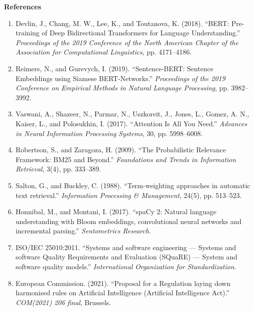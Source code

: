 \documentclass[12pt,a4paper]{report}
\begin{document}
\newpage
{}
\begin{center}
    {\Large \textbf{References}}
\end{center}
\vspace{0.8cm}

\begin{enumerate}
    \item Devlin, J., Chang, M. W., Lee, K., and Toutanova, K. (2018). ``BERT: Pre-training of Deep Bidirectional Transformers for Language Understanding.'' \textit{Proceedings of the 2019 Conference of the North American Chapter of the Association for Computational Linguistics}, pp. 4171--4186.
    \item Reimers, N., and Gurevych, I. (2019). ``Sentence-BERT: Sentence Embeddings using Siamese BERT-Networks.'' \textit{Proceedings of the 2019 Conference on Empirical Methods in Natural Language Processing}, pp. 3982--3992.
    \item Vaswani, A., Shazeer, N., Parmar, N., Uszkoreit, J., Jones, L., Gomez, A. N., Kaiser, L., and Polosukhin, I. (2017). ``Attention Is All You Need.'' \textit{Advances in Neural Information Processing Systems}, 30, pp. 5998--6008.
    \item Robertson, S., and Zaragoza, H. (2009). ``The Probabilistic Relevance Framework: BM25 and Beyond.'' \textit{Foundations and Trends in Information Retrieval}, 3(4), pp. 333--389.
    \item Salton, G., and Buckley, C. (1988). ``Term-weighting approaches in automatic text retrieval.'' \textit{Information Processing \& Management}, 24(5), pp. 513--523.
    \item Honnibal, M., and Montani, I. (2017). ``spaCy 2: Natural language understanding with Bloom embeddings, convolutional neural networks and incremental parsing.'' \textit{Sentometrics Research}.
    \item ISO/IEC 25010:2011. ``Systems and software engineering --- Systems and software Quality Requirements and Evaluation (SQuaRE) --- System and software quality models.'' \textit{International Organization for Standardization}.
    \item European Commission. (2021). ``Proposal for a Regulation laying down harmonised rules on Artificial Intelligence (Artificial Intelligence Act).'' \textit{COM(2021) 206 final}, Brussels.
\end{enumerate}
\end{document}
